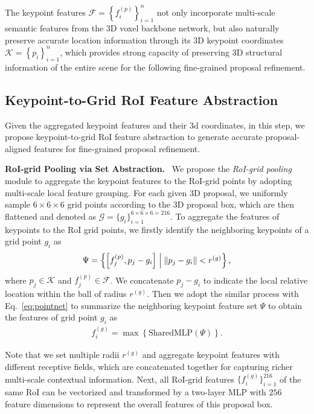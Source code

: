 \documentclass[natbib,twocolumn]{svjour3}          \smartqed  \usepackage{graphicx}
\begin{document}
The keypoint features $\mathcal{F}=\left\{f^{(p)}_i\right\}_{i=1}^n$ not only incorporate multi-scale semantic features from the 3D voxel backbone network, but also naturally preserve accurate location information through its 3D keypoint coordinates $\mathcal{K}=\left\{p_i\right\}_{i=1}^n$, which provides strong capacity of preserving 3D structural information of the entire scene for the following fine-grained proposal refinement.


\subsection{Keypoint-to-Grid RoI Feature Abstraction}\label{sec:roi_grid_pool}
Given the aggregated keypoint features and their 3d coordinates, in this step, we propose keypoint-to-grid RoI feature abstraction to generate accurate proposal-aligned features for fine-grained proposal refinement. 

\noindent
\textbf{RoI-grid Pooling via Set Abstraction.}~
We propose the \textit{RoI-grid pooling} module to aggregate the keypoint features to the RoI-grid points by adopting multi-scale local feature grouping.
For each given 3D proposal, we uniformly sample $6\times 6\times 6$ grid points according to the 3D proposal box, which are then flattened and denoted as $\mathcal{G}=\{g_i\}_{i=1}^{6\times 6\times 6=216}$.
To aggregate the features of keypoints to the RoI grid points, 
we firstly identify the neighboring keypoints of a grid point $g_i$ as 
\begin{align}
	\Psi =\left\lbrace \left[f_j^{(p)}, p_j - g_i\right] \;\middle|\;
	\begin{tabular}{@{}l@{}}
		$\left\Vert p_j - g_i \right\Vert < r^{(g)}$\\
	\end{tabular}
	\right\rbrace,
\end{align}
where $p_j \in \mathcal{K}$ and $f_j^{(p)} \in \mathcal{F}$. We concatenate $p_j-g_i$ to indicate the local relative location within the ball of radius $r^{(g)}$. 
Then we adopt the similar process with Eq.~\eqref{eq:pointnet} to summarize the neighboring keypoint feature set $\Psi$ to obtain the features of grid point $g_i$ as 
\begin{align}\label{pointnet2}
	f_i^{(g)} = \max \left\{\text{SharedMLP}\left(\Psi\right)\right\}.
\end{align}

Note that we set multiple radii $r^{(g)}$ and aggregate keypoint features with different receptive fields, which are concatenated together for capturing richer multi-scale contextual information. 
Next, all RoI-grid features $\{f_i^{(g)}\}_{i=1}^{216}$ of the same RoI can be vectorized and transformed by a two-layer MLP with $256$ feature dimensions to represent the overall features of this proposal box. 
\end{document}

